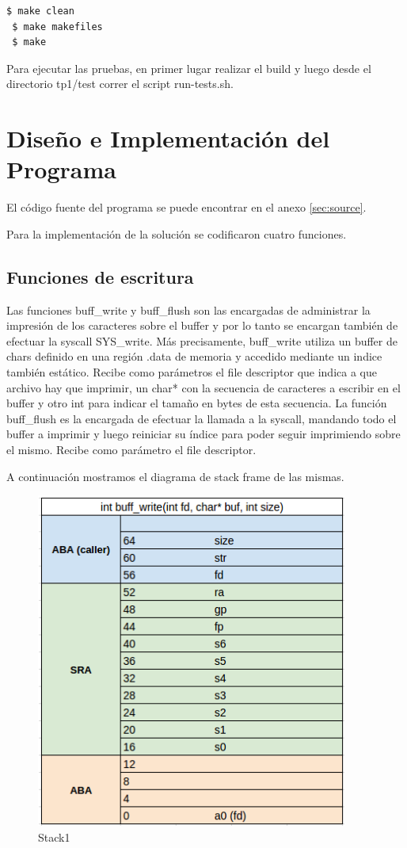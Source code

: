 \documentclass{article}
\begin{document}
\begin{lstlisting}[language=bash]
 $ make clean
 $ make makefiles
 $ make
\end{lstlisting}

Para ejecutar las pruebas, en primer lugar realizar el build y luego desde el directorio tp1/test correr el script run-tests.sh.

\section{Diseño e Implementación del Programa}

El código fuente del programa se puede encontrar en el anexo \ref{sec:source}.

Para la implementación de la solución se codificaron cuatro funciones.


\subsection{Funciones de escritura}

Las funciones buff\_write y buff\_flush son las encargadas de administrar la impresión de los caracteres sobre el buffer y por lo tanto se encargan también de efectuar la syscall SYS\_write. Más precisamente, buff\_write utiliza un buffer de chars definido en una región .data de memoria y accedido mediante un indice también estático. Recibe como parámetros el file descriptor que indica a que archivo hay que imprimir, un char* con la secuencia de caracteres a escribir en el buffer y otro int para indicar el tamaño en bytes de esta secuencia.
La función buff\_flush es la encargada de efectuar la llamada a la syscall, mandando todo el buffer a imprimir y luego reiniciar su índice para poder seguir imprimiendo sobre el mismo. Recibe como parámetro el file descriptor.

A continuación mostramos el diagrama de stack frame de las mismas.

\begin{figure}[H]
	\centering
		\includegraphics[scale=0.4]{stack1.png}
	\caption{Stack1}
	\label{fig:stack1}
\end{figure}
\end{document}
